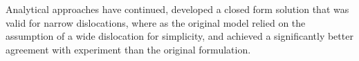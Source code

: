 Analytical approaches have continued, \citet{Joos1997} developed a closed form solution that was valid for narrow dislocations, where as the original model relied on the assumption of a wide dislocation for simplicity, and achieved a significantly better agreement with experiment than the original formulation.








